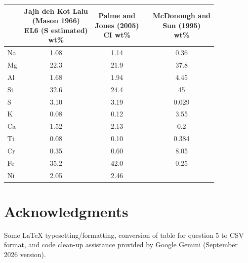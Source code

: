 \documentclass{template}
\begin{document}
\begin{enumerate}[label=\textbf{\arabic*.}]
    \begin{table}[H]
        \centering
        \begin{tabular}{l S[table-format=2.2] S[table-format=2.2] l S[table-format=2.3]}
            \toprule
            & {\parbox{3.5cm}{\centering Jajh deh Kot Lalu \\ \small (Mason 1966) \\ EL6 (S estimated) \\ wt\%}}
            & {\parbox{3.0cm}{\centering Palme and \\ Jones (2005) \\[1.2ex] CI wt\%}}
            &
            & {\parbox{3.0cm}{\centering McDonough and \\ Sun (1995) \\[1.2ex] wt\%}} \\
            \midrule
            Na & 1.08 & 1.14 &   & 0.36 \\
            Mg & 22.3 & 21.9 &    & 37.8 \\
            Al & 1.68 & 1.94 &  & 4.45 \\
            Si & 32.6 & 24.4 &   & 45 \\
            S  & 3.10 & 3.19 &    & 0.029 \\
            K  & 0.08 & 0.12 &    & 3.55 \\
            Ca & 1.52 & 2.13 &   & 0.2 \\
            Ti & 0.08 & 0.10 &  & 0.384 \\
            Cr & 0.35 & 0.60 &    & 8.05 \\
            Fe & 35.2 & 42.0 &    & 0.25 \\
            Ni & 2.05 & 2.46 &            & \\
            \bottomrule
        \end{tabular}
    \end{table}

\end{enumerate}

\section*{Acknowledgments}
Some LaTeX typesetting/formatting, conversion of table for question 5 to CSV format, and code clean-up assistance provided by Google Gemini (September 2026 version).

\singlespacing
\printbibliography[title={References}]



\end{document}

